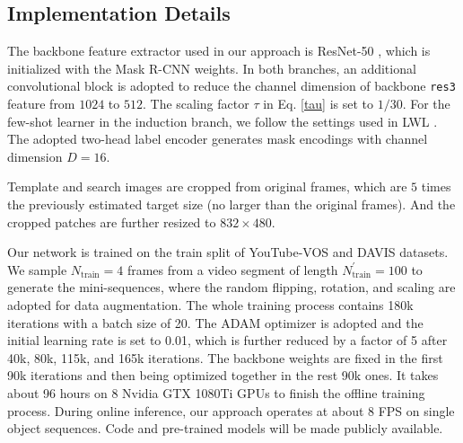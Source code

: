 \documentclass[10pt,twocolumn,letterpaper]{article}
\begin{document}
\subsection{Implementation Details}
The backbone feature extractor used in our approach is ResNet-50 \cite{resnet2016A}, which is initialized with the Mask R-CNN \cite{maskrcnn2017A} weights. In both branches, an additional convolutional block is adopted to reduce the channel dimension of backbone \texttt{res3} feature from $1024$ to $512$. The scaling factor $\tau$ in Eq. \eqref{tau} is set to $1/30$. For the few-shot learner in the induction branch, we follow the settings used in LWL \cite{Goutam2020A}. The adopted two-head label encoder generates mask encodings with channel dimension $D=16$.

Template and search images are cropped from original frames, which are $5$ times the previously estimated target size (no larger than the original frames). And the cropped patches are further resized to $832 \times 480$.

Our network is trained on the train split of YouTube-VOS \cite{Xu2018YouTubeVOSAL} and DAVIS \cite{DAVIS2016} datasets. We sample $N_{\text{train}}=4$ frames from a video segment of length $N_{\text{train}}^{'}=100$ to generate the mini-sequences, where the random flipping, rotation, and scaling are adopted for data augmentation. The whole training process contains 180k iterations with a batch size of 20. The ADAM \cite{ADAM2015A} optimizer is adopted and the initial learning rate is set to 0.01, which is further reduced by a factor of 5 after 40k, 80k, 115k, and 165k iterations. The backbone weights are fixed in the first 90k iterations and then being optimized together in the rest 90k ones. It takes about 96 hours on 8 Nvidia GTX 1080Ti GPUs to finish the offline training process. During online inference, our approach operates at about 8 FPS on single object sequences.
Code and pre-trained models will be made publicly available.
\end{document}
